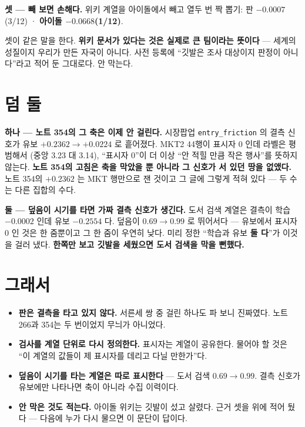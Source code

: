 \documentclass[11pt]{article}
\begin{document}
\textbf{셋 --- 빼 보면 손해다.} 위키 계열을 아이돌에서 빼고 열두 번 짝
뽑기: 판 $-0.0007$(3/12) · \textbf{아이돌 $-0.0668$(1/12)}.

셋이 같은 말을 한다. \textbf{위키 문서가 있다는 것은 실제로 큰 팀이라는
뜻이다} --- 세계의 성질이지 우리가 만든 자국이 아니다. 사전 등록에
``깃발은 조사 대상이지 판정이 아니다''라고 적어 둔 그대로다. 안 막는다.

\section{덤 둘}

\textbf{하나 --- 노트 354의 그 축은 이제 안 걸린다.} 시장팝업
\texttt{entry\_friction} 의 결측 신호가 유보 $+0.2362 \to \mathbf{+0.0224}$
로 흩어졌다. MKT2 44행이 표시자 0 인데 라벨은 평범해서
(중앙 3.23 대 3.14), ``표시자 0''이 더 이상 ``안 적힐 만큼 작은 행사''를
뜻하지 않는다. \textbf{노트 354의 고침은 축을 막았을 뿐 아니라 그 신호가
서 있던 땅을 없앴다.} 노트 354의 $+0.2362$ 는 MKT 행만으로 잰 것이고 그
글에 그렇게 적혀 있다 --- 두 수는 다른 집합의 수다.

\textbf{둘 --- 덮음이 시기를 타면 가짜 결측 신호가 생긴다.} 도서 검색
계열은 결측이 학습 $-0.0002$ 인데 유보 $\mathbf{-0.2554}$ 다. 덮음이
$0.69 \to 0.99$ 로 뛰어서다 --- 유보에서 표시자 0 인 것은 한 줌뿐이고
그 한 줌이 우연히 낮다. 미리 정한 ``학습과 유보 \textbf{둘 다}''가
이것을 걸러 냈다. \textbf{한쪽만 보고 깃발을 세웠으면 도서 검색을 막을
뻔했다.}

\section{그래서}

\begin{itemize}
\item \textbf{판은 결측을 타고 있지 않다.} 서른세 쌍 중 걸린 하나도
파 보니 진짜였다. 노트 266과 354는 두 번이었지 무늬가 아니었다.
\item \textbf{검사를 계열 단위로 다시 정의한다.} 표시자는 계열이 공유한다.
물어야 할 것은 ``이 계열의 값들이 제 표시자를 데리고 다닐 만한가''다.
\item \textbf{덮음이 시기를 타는 계열은 따로 표시한다} --- 도서 검색
$0.69 \to 0.99$. 결측 신호가 유보에만 나타나면 축이 아니라 수집 이력이다.
\item \textbf{안 막은 것도 적는다.} 아이돌 위키는 깃발이 섰고 살렸다.
근거 셋을 위에 적어 뒀다 --- 다음에 누가 다시 물으면 이 문단이 답이다.
\end{itemize}
\end{document}
